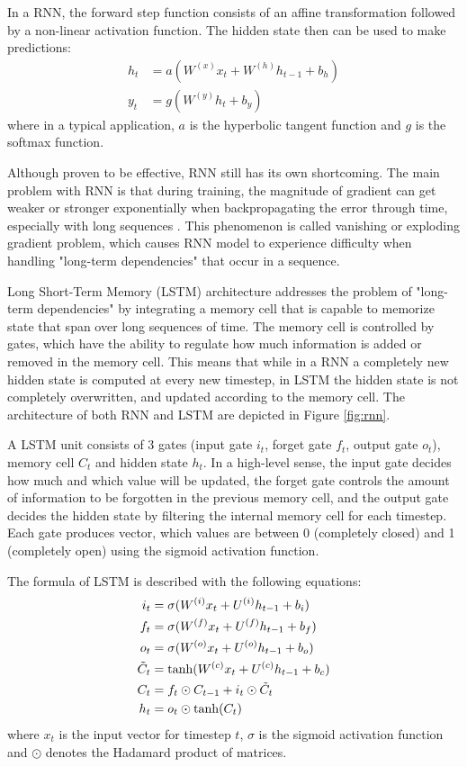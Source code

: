 \documentclass[12pt]{extarticle}
\begin{document}
In a RNN, the forward step function consists of an affine transformation followed by a non-linear activation function. The hidden state then can be used to make predictions:
\begin{align}
h_{t} &= a(W^{(x)}x_{t} + W^{(h)}h_{t-1} + b_{h})\\
y_{t} &= g(W^{(y)}h_{t} + b_{y}) 
\end{align}
where in a typical application, $a$ is the hyperbolic tangent function and $g$ is the softmax function.

Although proven to be effective, RNN still has its own shortcoming. The main problem with RNN is that during training, the magnitude of gradient can get weaker or stronger exponentially when backpropagating the error through time, especially with long sequences \citep{Hochreiter:1998:VGP:353515.355233, 279181}. This phenomenon is called vanishing or exploding gradient problem, which causes RNN model to experience difficulty when handling "long-term dependencies" that occur in a sequence.

Long Short-Term Memory (LSTM) architecture \citep{Hochreiter:1997:LSM:1246443.1246450} addresses the problem of "long-term dependencies" by integrating a memory cell that is capable to memorize state that span over long sequences of time. The memory cell is controlled by gates, which have the ability to regulate how much information is added or removed in the memory cell. This means that while in a RNN a completely new hidden state is computed at every new timestep, in LSTM the hidden state is not completely overwritten, and updated according to the memory cell. The architecture of both RNN and LSTM are depicted in Figure \ref{fig:rnn}.

A LSTM unit consists of 3 gates (input gate $i_{t}$, forget gate $f_{t}$, output gate $o_{t}$), memory cell $C_{t}$ and hidden state $h_{t}$. In a high-level sense, the input gate decides how much and which value will be updated, the forget gate controls the amount of information to be forgotten in the previous memory cell, and the output gate decides the hidden state by filtering the internal memory cell for each timestep. Each gate produces vector, which values are between 0 (completely closed) and 1 (completely open) using the sigmoid activation function. 

The formula of LSTM is described with the following equations:
\begin{align}
i_{t} &= \sigma(W^{(i)}x_{t} + U^{(i)}h_{t-1} + b_{i}) \\
f_{t} &= \sigma(W^{(f)}x_{t} + U^{(f)}h_{t-1} + b_{f}) \\
o_{t} &= \sigma(W^{(o)}x_{t} + U^{(o)}h_{t-1} + b_{o}) \\
\tilde{C}_{t} &= \textnormal{tanh}(W^{(c)}x_{t} + U^{(c)}h_{t-1} + b_{c}) \\
C_{t} &= f_{t} \odot C_{t-1} + i_{t} \odot \tilde{C}_{t} \\
h_{t} &= o_{t} \odot \textnormal{tanh}(C_{t})
\end{align}
where $x_{t}$ is the input vector for timestep $t$, $\sigma$ is the sigmoid activation function and $\odot$ denotes the Hadamard product of matrices. 
\end{document}
